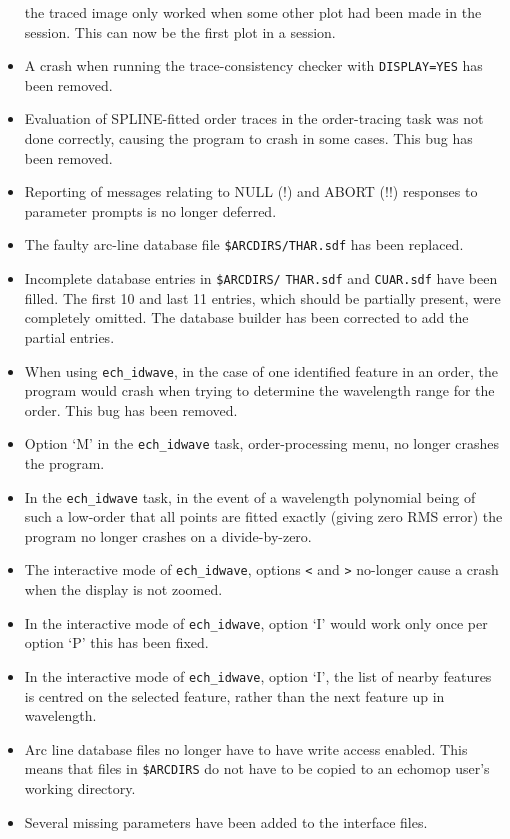 \documentclass[11pt,twoside]{article}
\begin{document}
\begin{itemize}
   the traced image only worked when some other plot had been made in
   the session.  This can now be the first plot in a session.
\item A crash when running the trace-consistency checker with
   {\tt DISPLAY=YES} has been removed.
\item Evaluation of SPLINE-fitted order traces in the order-tracing task
   was not done correctly, causing the program to crash in some cases.
   This bug has been removed.
\item Reporting of messages relating to NULL (!) and ABORT (!!) responses
   to parameter prompts is no longer deferred.
\item The faulty arc-line database file \texttt{\$ARCDIRS/THAR.sdf}
   has been replaced.
\item Incomplete database entries in \texttt{\$ARCDIRS/} \texttt{THAR.sdf} and
   \texttt{CUAR.sdf}
   have been filled.  The first 10 and last 11 entries, which should be
   partially present, were completely omitted.  The database builder has
   been corrected to add the partial entries.
\item When using {\tt ech\_idwave}, in the case of one identified feature in an
   order, the program would crash when trying to determine the wavelength
   range for the order.  This bug has been removed.
\item Option `M' in the {\tt ech\_idwave} task, order-processing menu,
   no longer crashes the program.
\item In the {\tt ech\_idwave} task, in the event of a wavelength polynomial
   being
   of such a low-order that all points are fitted exactly (giving zero
   RMS error) the program no longer crashes on a divide-by-zero.
\item The interactive mode of {\tt ech\_idwave}, options \texttt{<} and \texttt{>}
   no-longer cause a crash when the display is not zoomed.
\item In the interactive mode of {\tt ech\_idwave}, option `I' would work only
   once per option `P' this has been fixed.
\item In the interactive mode of {\tt ech\_idwave}, option `I', the list of
   nearby
   features is centred on the selected feature, rather than the next
   feature up in wavelength.
\item Arc line database files no longer have to have write access enabled.
   This means that files in \texttt{\$ARCDIRS} do not have to be copied to an
   {\sc echomop} user's working directory.
\item Several missing parameters have been added to the interface files.

\end{itemize}
\end{document}
